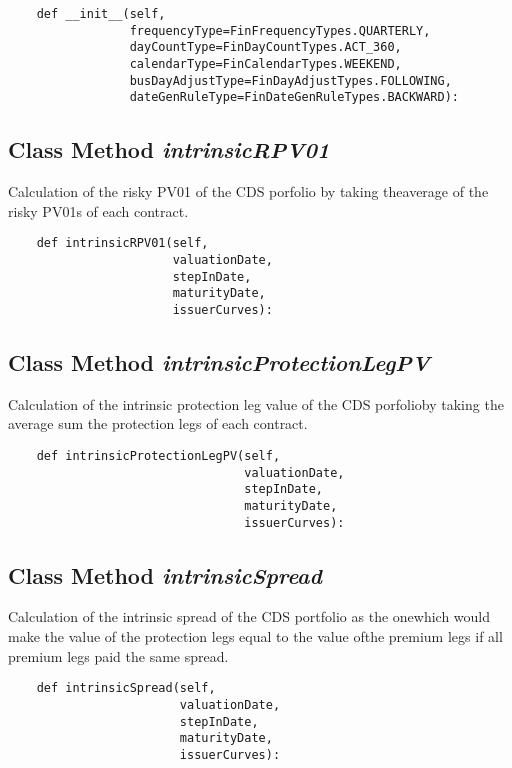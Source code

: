 \documentclass[twoside,11pt]{book}
\begin{document}
\begin{lstlisting}
    def __init__(self,
                 frequencyType=FinFrequencyTypes.QUARTERLY,
                 dayCountType=FinDayCountTypes.ACT_360,
                 calendarType=FinCalendarTypes.WEEKEND,
                 busDayAdjustType=FinDayAdjustTypes.FOLLOWING,
                 dateGenRuleType=FinDateGenRuleTypes.BACKWARD):
\end{lstlisting}

\subsection{Class Method {\it intrinsicRPV01}}
Calculation of the risky PV01 of the CDS porfolio by taking theaverage of the risky PV01s of each contract. 

\begin{lstlisting}
    def intrinsicRPV01(self,
                       valuationDate,
                       stepInDate,
                       maturityDate,
                       issuerCurves):
\end{lstlisting}

\subsection{Class Method {\it intrinsicProtectionLegPV}}
Calculation of the intrinsic protection leg value of the CDS porfolioby taking the average sum the protection legs of each contract. 

\begin{lstlisting}
    def intrinsicProtectionLegPV(self,
                                 valuationDate,
                                 stepInDate,
                                 maturityDate,
                                 issuerCurves):
\end{lstlisting}

\subsection{Class Method {\it intrinsicSpread}}
Calculation of the intrinsic spread of the CDS portfolio as the onewhich would make the value of the protection legs equal to the value ofthe premium legs if all premium legs paid the same spread. 

\begin{lstlisting}
    def intrinsicSpread(self,
                        valuationDate,
                        stepInDate,
                        maturityDate,
                        issuerCurves):
\end{lstlisting}
\end{document}
